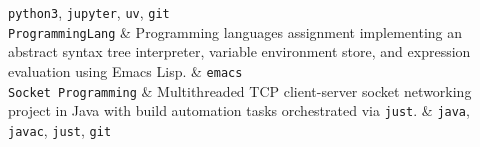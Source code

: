 \begin{table}[htbp]
\begin{tabularx}
		\texttt{python3}, \texttt{jupyter}, \texttt{uv}, \texttt{git}                                                                                                   \\
		\addlinespace \texttt{ProgrammingLang}                                   & Programming languages assignment
		implementing an abstract syntax tree interpreter, variable environment
		store, and expression evaluation using Emacs Lisp.                       & \texttt{emacs}                                                                       \\ \addlinespace
		\texttt{Socket Programming}                                              & Multithreaded TCP client-server socket
		networking project in Java with build automation tasks orchestrated via
		\texttt{just}.                                                           & \texttt{java}, \texttt{javac}, \texttt{just}, \texttt{git}
		\\ \bottomrule
	\end{tabularx}
\end{table}

